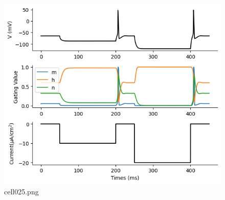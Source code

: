 \begin{figure}[ht]
	\centering
	\includegraphics[scale=0.8, max width=\linewidth]{./fig/neuron-model/hodgkin-huxley/cell025.png}
	\caption{cell025.png}
	\label{cell025.png}
\end{figure}